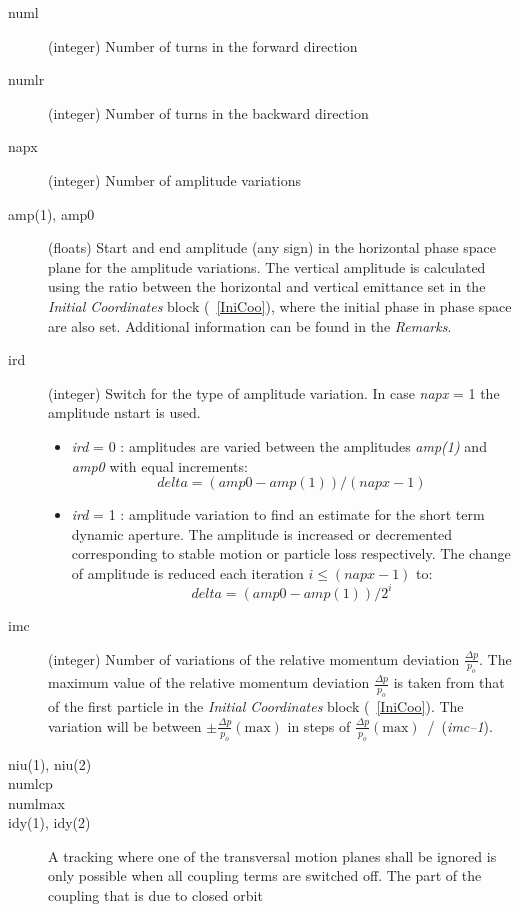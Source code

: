 \documentclass[a4paper,11pt]{report}
\begin{document}
\begin{description}
\item [numl] (integer) Number of turns in the forward direction
\item [numlr] (integer) Number of turns in the backward direction
\item [napx] (integer) Number of amplitude variations
\item [amp(1), amp0] (floats) Start and end amplitude (any sign) in
  the horizontal phase space plane for the amplitude variations. The
  vertical amplitude is calculated using the ratio between the
  horizontal and vertical emittance set in the {\em Initial
    Coordinates} \/block (~\ref{IniCoo}), where the initial phase in
  phase space are also set. Additional information can be found in the
  {\em Remarks}\/.
\item [ird] (integer) Switch for the type of amplitude variation. In
  case {\em napx} \/= 1 the amplitude nstart is used.
 \begin{itemize}
 \item {\em ird} \/= 0 : amplitudes are varied between the amplitudes
   {\em amp(1)} \/and {\em amp0} \/with equal increments:
   $$
   delta = (amp0-amp(1)) / (napx-1)
   $$
 \item {\em ird} \/= 1 : amplitude variation to find an estimate for
   the short term dynamic aperture. The amplitude is increased or
   decremented corresponding to stable motion or particle loss
   respectively.  The change of amplitude is reduced each iteration
   \mbox{$i \le (napx-1) $} to:
   $$
   delta = (amp0-amp(1)) / 2^{i}
   $$
 \end{itemize}
\item [imc] (integer) Number of variations of the relative momentum
  deviation \mbox{$ \frac{\Delta p}{p_o} $}.  The maximum value of the
  relative momentum deviation \mbox{$ \frac{\Delta p}{p_o} $} is taken
  from that of the first particle in the {\em Initial Coordinates}
  \/block (~\ref{IniCoo}).  The variation will be between \mbox{$ \pm
    \frac{\Delta p}{p_o} (\mathrm{max}) $} in steps of \mbox{$
    \frac{\Delta p}{p_o} (\mathrm{max}) $ / ({\em imc--1}\/).}
\item[niu(1), niu(2)]
\item[numlcp]
\item[numlmax] 
\item [idy(1), idy(2)] A tracking where one of the transversal motion
  planes shall be ignored is only possible when all coupling terms are
  switched off.  The part of the coupling that is due to closed orbit

\end{description}
\end{document}

